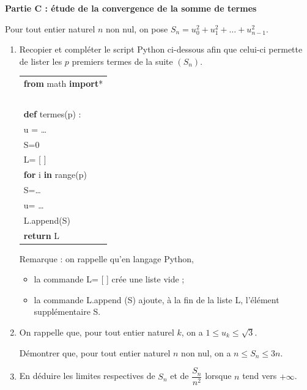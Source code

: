 \medskip

\textbf{Partie C : étude de la convergence de la somme de termes}

\medskip

Pour tout entier naturel $n$ non nul, on pose $S_n = u_0^2 + u_1^2 + \ldots + u_{n-1}^2$.

\medskip

\begin{enumerate}
\item Recopier et compléter le script Python ci-dessous afin que celui-ci permette de lister
les $p$ premiers termes de la suite $(S_n)$.

\begin{center}
\begin{ttfamily}
\begin{tabular}{|l|}\hline
\textbf{from} math \textbf{import}*\\
~\\
\textbf{def} termes(p) :\\
\qquad  u = \ldots\\
\qquad  S=0\\
\qquad  L= [ ]\\
\qquad  \textbf{for} i \textbf{in} range(p)\\
\qquad \qquad S=\ldots\\
\qquad \qquad u= \ldots\\
\qquad \qquad L.append(S) \\
\qquad \textbf{return} L\\ \hline
\end{tabular}
\end{ttfamily}
\end{center}

Remarque : on rappelle qu'en langage Python,

\begin{itemize}[label=$\bullet~$]
\item la commande L= [ ] crée une liste vide ;
\item la commande L.append (S) ajoute, à la fin de la liste L, l'élément supplémentaire S.
\end{itemize}

\item On rappelle que, pour tout entier naturel $k$, on a $1 \leqslant u_k \leqslant \sqrt 3$.

Démontrer que, pour tout entier naturel $n$ non nul, on a $n \leqslant S_n \leqslant 3n$.
\item En déduire les limites respectives de $S_n$ et de $\dfrac{S_n}{n^2}$ lorsque $n$ tend vers $+ \infty$.
\end{enumerate}

\medskip
